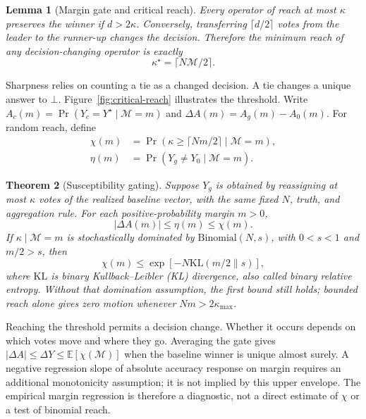 \documentclass[11pt,a4paper]{article}
\newtheorem{theorem}{Theorem}
\newtheorem{lemma}[theorem]{Lemma}
\theoremstyle{definition}
\newcommand{\Marg}{\mathcal{M}}
\newcommand{\Truth}{Y^{\star}}
\newcommand{\kstar}{\kappa^{\star}}
\newcommand{\KL}{\mathrm{KL}}
\begin{document}
\begin{lemma}[Margin gate and critical reach]
\label{lem:gate}
Every operator of reach at most $\kappa$ preserves the winner if
$d>2\kappa$. Conversely, transferring $\lceil d/2\rceil$ votes from the
leader to the runner-up changes the decision. Therefore the minimum reach
of any decision-changing operator is exactly
\begin{equation}
\kstar=\lceil N\Marg/2\rceil.
\label{eq:main-chi}
\end{equation}
\end{lemma}

Sharpness relies on counting a tie as a changed decision. A tie changes a unique answer
to $\bot$. Figure~\ref{fig:critical-reach} illustrates the threshold.
Write $A_c(m)=\Pr(Y_c=\Truth\mid\Marg=m)$ and
$\Delta A(m)=A_g(m)-A_0(m)$. For random reach, define
\begin{equation}
\begin{aligned}
\chi(m)&=\Pr(\kappa\ge\lceil Nm/2\rceil\mid\Marg=m),\\
\eta(m)&=\Pr(Y_g\neq Y_0\mid\Marg=m).
\end{aligned}
\label{eq:main-susceptibility}
\end{equation}

\begin{theorem}[Susceptibility gating]
\label{thm:gating}
Suppose $Y_g$ is obtained by reassigning at most $\kappa$ votes of the
realized baseline vector, with the same fixed $N$, truth, and aggregation
rule. For each positive-probability margin $m>0$,
\begin{equation}
|\Delta A(m)|\le\eta(m)\le\chi(m).
\label{eq:gating-bound}
\end{equation}
If $\kappa\mid\Marg=m$ is stochastically dominated by
$\mathrm{Binomial}(N,s)$, with $0<s<1$ and $m/2>s$, then
\begin{equation}
\chi(m)\le\exp\!\left[-N\KL(m/2\|s)\right],
\label{eq:main-reach-tail}
\end{equation}
where $\KL$ is binary Kullback--Leibler (KL) divergence, also called binary relative entropy. Without that domination assumption,
the first bound still holds; bounded reach alone gives zero motion whenever
$Nm>2\kappa_{\max}$.
\end{theorem}

Reaching the threshold permits a decision change. Whether it occurs depends
on which votes move and where they go.
Averaging the gate gives $|\Delta A|\le\Delta Y\le\mathbb E[\chi(\Marg)]$
when the baseline winner is unique almost surely. A negative regression
slope of absolute accuracy response on margin requires an additional
monotonicity assumption; it is not implied by this upper envelope.
The empirical margin regression is therefore a diagnostic, not a direct
estimate of $\chi$ or a test of binomial reach.
\end{document}

